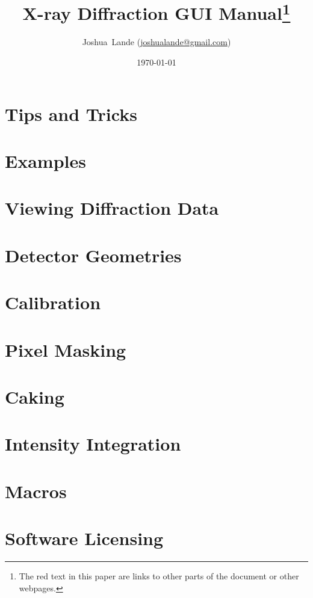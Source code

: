 \documentclass[12pt]{book}
\begin{document}
\title{X-ray Diffraction GUI Manual\footnote{The red text in this paper are links to other parts of the document or other webpages.}}
\date{\today}
\author{Joshua~Lande (\href{mailto:joshualande@gmail.com}{joshualande@gmail.com})}
\maketitle

\tableofcontents

\chapter{Tips and Tricks}


\chapter{Examples}


\chapter{Viewing Diffraction Data}\label{viewing_data}


\chapter{Detector Geometries}


\chapter{Calibration}\label{calibration}



\chapter{Pixel Masking}



\chapter{Caking}\label{Caking}


\chapter{Intensity Integration}


\chapter{Macros}


\chapter{Software Licensing}



 

\printindex
\end{document}
